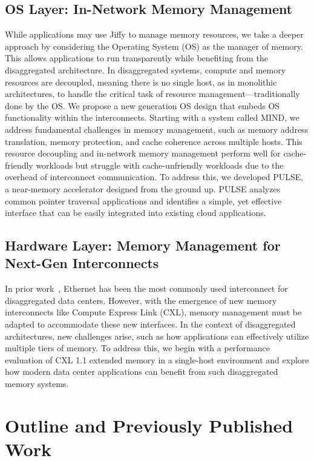 \subsection{OS Layer: In-Network Memory Management}

While applications may use Jiffy to manage memory resources, we take a deeper approach by considering the Operating System (OS) as the manager of memory. This allows applications to run transparently while benefiting from the disaggregated architecture. In disaggregated systems, compute and memory resources are decoupled, meaning there is no single host, as in monolithic architectures, to handle the critical task of resource management—traditionally done by the OS. We propose a new generation OS design that embeds OS functionality within the interconnects. Starting with a system called MIND, we address fundamental challenges in memory management, such as memory address translation, memory protection, and cache coherence across multiple hosts. This resource decoupling and in-network memory management perform well for cache-friendly workloads but struggle with cache-unfriendly workloads due to the overhead of interconnect communication. To address this, we developed PULSE, a near-memory accelerator designed from the ground up. PULSE analyzes common pointer traversal applications and identifies a simple, yet effective interface that can be easily integrated into existing cloud applications.

\subsection{Hardware Layer: Memory Management for Next-Gen Interconnects}
In prior work~\cite{mind,legoos}, Ethernet has been the most commonly used interconnect for disaggregated data centers. However, with the emergence of new memory interconnects like Compute Express Link (CXL), memory management must be adapted to accommodate these new interfaces. In the context of disaggregated architectures, new challenges arise, such as how applications can effectively utilize multiple tiers of memory. To address this, we begin with a performance evaluation of CXL 1.1 extended memory in a single-host environment and explore how modern data center applications can benefit from such disaggregated memory systems.

\section{Outline and Previously Published Work}

